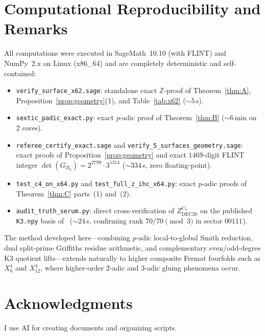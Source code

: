 \documentclass[11pt,a4paper]{amsart}
\theoremstyle{definition}
\newcommand{\ZZ}{\mathbb{Z}}
\begin{document}
\section{Computational Reproducibility and Remarks}

All computations were executed in SageMath~10.10 (with FLINT) and NumPy~2.x on Linux (x86\_64) and are completely deterministic and self-contained:
\begin{itemize}
  \item \texttt{verify\_surface\_x62.sage}: standalone exact $\ZZ$-proof of Theorem~\ref{thm:A}, Proposition~\ref{prop:geometry}(1), and Table~\ref{tab:x62} ($\sim 5$\,s).
  \item \texttt{sextic\_padic\_exact.py}: exact $p$-adic proof of Theorem~\ref{thm:B} ($\sim 6$\,min on 2 cores).
  \item \texttt{referee\_certify\_exact.sage} and \texttt{verify\_5\_surfaces\_geometry.sage}: exact proofs of Proposition~\ref{prop:geometry} and exact $1469$-digit FLINT integer $\det(G_{B_0}) = 2^{2799}\cdot 3^{1314}$ ($\sim 334$\,s, zero floating-point).
  \item \texttt{test\_c4\_on\_x64.py} and \texttt{test\_full\_z\_ihc\_x64.py}: exact $p$-adic proofs of Theorem~\ref{thm:C} parts~(1) and~(2).
  \item \texttt{audit\_truth\_serum.py}: direct cross-verification of $Z_{\mathrm{DEC20}}^{C_4}$ on the published \texttt{K3.npy} basis of~\cite{SdJ26} ($\sim 24$\,s, confirming rank $70/70 \pmod 3$ in sector $00111$).
\end{itemize}
The method developed here---combining $p$-adic local-to-global Smith reduction, dual split-prime Griffiths residue arithmetic, and complementary even/odd-degree K3 quotient lifts---extends naturally to higher composite Fermat fourfolds such as $X_8^4$ and $X_{12}^4$, where higher-order $2$-adic and $3$-adic gluing phenomena occur.

\section*{Acknowledgments}
I use AI for creating documents and organizing scripts.
\end{document}
